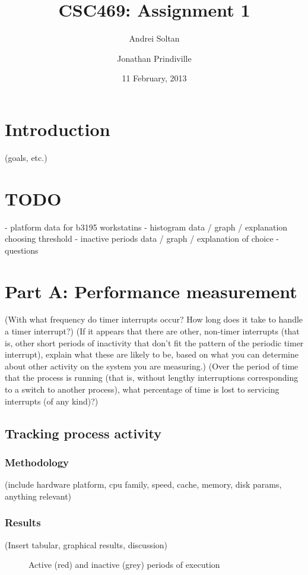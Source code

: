 \documentclass{article}
\author{Andrei Soltan \and Jonathan Prindiville}
\title{CSC469: Assignment 1}
\date{11 February, 2013}
\begin{document}
\maketitle

\tableofcontents

\newpage
\section{Introduction}
(goals, etc.)

\section{TODO}
- platform data for b3195 workstatins
- histogram data / graph / explanation choosing threshold
- inactive periods data / graph / explanation of choice
- questions

\newpage
\section{Part A: Performance measurement}

(With what frequency do timer interrupts occur? How long does it take to handle a timer interrupt?)
(If it appears that there are other, non-timer interrupts (that is, other short periods of inactivity that don't fit the pattern of the periodic timer interrupt), explain what these are likely to be, based on what you can determine about other activity on the system you are measuring.)
(Over the period of time that the process is running (that is, without lengthy interruptions corresponding to a switch to another process), what percentage of time is lost to servicing interrupts (of any kind)?)

\subsection{Tracking process activity}
\subsubsection{Methodology}
(include hardware platform, cpu family, speed, cache, memory, disk params, anything relevant)
\subsubsection{Results}
(Insert tabular, graphical results, discussion)
\begin{center}
    \begin{figure}[h]
        \caption{Active (red) and inactive (grey) periods of execution}
        
    \end{figure}
\end{center}
\end{document}
